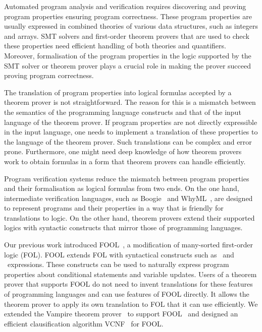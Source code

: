 Automated program analysis and verification requires discovering and proving program properties ensuring program correctness. 
 These program properties are usually expressed in combined theories of various data structures, such as integers and arrays. 
SMT solvers and first-order theorem provers that are used to check these properties need efficient handling of both theories and quantifiers. Moreover, 
formalisation of the program properties in the logic supported by the SMT solver or theorem prover plays a crucial role in making the prover succeed proving program correctness. 

The translation of program properties into logical formulas accepted by a theorem prover is not straightforward. The reason for this is a mismatch between the semantics of the programming language constructs and that of the input language of the theorem prover. If program properties are not directly expressible in the input language, one needs to implement a translation of these properties to the language of the theorem prover. Such translations can be complex and error prone. Furthermore, one might need deep knowledge of how theorem provers work to obtain formulas in a form that theorem provers can handle efficiently.

Program verification systems reduce the mismatch between program properties and their formalisation as logical formulas from two ends. On the one hand, intermediate verification languages, such as Boogie~\cite{leino2008boogie} and WhyML~\cite{DBLP:conf/esop/FilliatreP13}, are designed to represent programs and their properties in a way that is friendly for translations to logic. On the other hand, theorem provers extend their supported logics with syntactic constructs that mirror those of programming languages.

Our previous work introduced FOOL~\cite{FOOL}, a modification of many-sorted first-order logic (FOL). FOOL extends FOL with syntactical constructs such as \ITE\ and \LETIN\ expressions. These constructs can be used to naturally express program properties about conditional statements and variable updates. Users of a theorem prover that supports FOOL do not need to invent translations for these features of programming languages and can use features of FOOL directly. It allows the theorem prover to apply its own translation to FOL that it can use efficiently. We extended the Vampire theorem prover~\cite{Vampire13} to support FOOL~\cite{VampireAndFOOL} and designed an efficient clausification algorithm VCNF~\cite{FOOLCNF} for FOOL.

